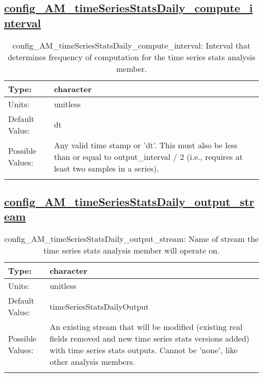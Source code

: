 \subsection[config\_AM\_timeSeriesStatsDaily\_compute\_interval]{\hyperref[sec:nm_tab_AM_timeSeriesStatsDaily]{config\_AM\_timeSeriesStatsDaily\_compute\_interval}}
\label{subsec:nm_sec_config_AM_timeSeriesStatsDaily_compute_interval}
\begin{center}
\begin{longtable}{| p{2.0in} || p{4.0in} |}
    \hline
    Type: & character \\
    \hline
    Units: & \si{unitless} \\
    \hline
    Default Value: & dt \\
    \hline
    Possible Values: & Any valid time stamp or 'dt'. This must also be less than or equal to output\_interval / 2 (i.e., requires at least two samples in a series). \\
    \hline
    \caption{config\_AM\_timeSeriesStatsDaily\_compute\_interval: Interval that determines frequency of computation for the time series stats analysis member.}
\end{longtable}
\end{center}
\subsection[config\_AM\_timeSeriesStatsDaily\_output\_stream]{\hyperref[sec:nm_tab_AM_timeSeriesStatsDaily]{config\_AM\_timeSeriesStatsDaily\_output\_stream}}
\label{subsec:nm_sec_config_AM_timeSeriesStatsDaily_output_stream}
\begin{center}
\begin{longtable}{| p{2.0in} || p{4.0in} |}
    \hline
    Type: & character \\
    \hline
    Units: & \si{unitless} \\
    \hline
    Default Value: & timeSeriesStatsDailyOutput \\
    \hline
    Possible Values: & An existing stream that will be modified (existing real fields removed and new time series stats versions added) with time series stats outputs. Cannot be 'none', like other analysis members. \\
    \hline
    \caption{config\_AM\_timeSeriesStatsDaily\_output\_stream: Name of stream the time series stats analysis member will operate on.}
\end{longtable}
\end{center}
